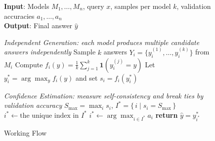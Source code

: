 \begin{figure}[t]
\begin{minipage}{\linewidth}
\begin{algorithm}[H]
\caption{\NAME{}{} Working Flow}
\label{alg:SLM-Mux}
\textbf{Input}: Models $M_1,\dots,M_n$, query $x$, samples per model $k$, validation accuracies $a_1,\dots,a_n$ \\
\textbf{Output}: Final answer $\hat{y}$
\begin{algorithmic}[1]
\Statex \textit{Independent Generation: each model produces multiple candidate answers independently}
    \State Sample $k$ answers $Y_i=\{y_i^{(1)},\dots,y_i^{(k)}\}$ from $M_i$
    \State Compute $f_i(y)=\tfrac{1}{k}\sum_{j=1}^{k}\mathbf{1}\!\left(y_i^{(j)}=y\right)$
    \State Let $y_i^*=\arg\max_{y} f_i(y)$ and set $s_i = f_i(y_i^*)$
\EndFor

\Statex \textit{Confidence Estimation: measure self-consistency and break ties by validation accuracy}
\State $S_{\max}=\max_{i} s_i$, \quad $I^*=\{\, i \mid s_i = S_{\max} \,\}$
    \State $i^* \gets \text{the unique index in } I^*$
\Else
    \State $i^* \gets \arg\max_{i \in I^*} a_i$
\EndIf
\State \textbf{return} $\hat{y}=y_{i^*}^*$
\end{algorithmic}
\end{algorithm}
\end{minipage}
\vspace{-5pt}
\end{figure}











